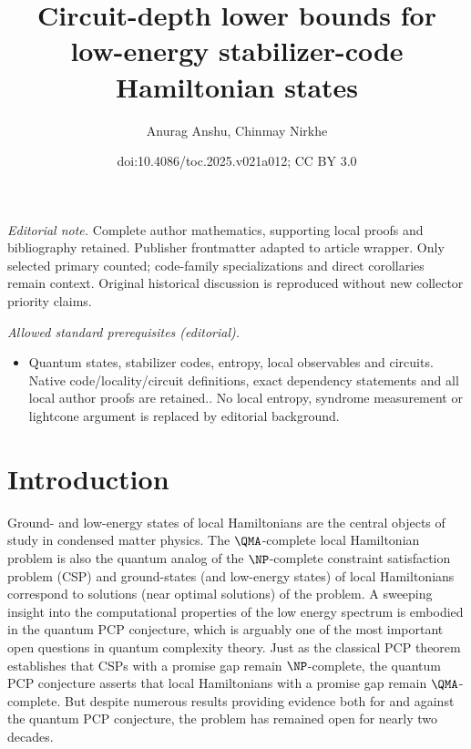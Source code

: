 \documentclass[11pt]{article}
\title{Circuit-depth lower bounds for low-energy stabilizer-code Hamiltonian states}
\author{Anurag Anshu, Chinmay Nirkhe}
\date{doi:10.4086/toc.2025.v021a012; CC BY 3.0}
\begin{document}
\maketitle
\noindent\textit{Editorial note.} Complete author mathematics, supporting local proofs and bibliography retained. Publisher frontmatter adapted to article wrapper. Only selected primary counted; code-family specializations and direct corollaries remain context. Original historical discussion is reproduced without new collector priority claims.\par\medskip
\noindent\textit{Allowed standard prerequisites (editorial).}\begin{itemize}
\item Quantum states, stabilizer codes, entropy, local observables and circuits. Native code/locality/circuit definitions, exact dependency statements and all local author proofs are retained.. No local entropy, syndrome measurement or lightcone argument is replaced by editorial background.
\end{itemize}\medskip
\section{Introduction}

Ground- and low-energy states of local Hamiltonians are the central objects of study in condensed matter physics. The $\QMA$-complete local Hamiltonian problem is also the quantum analog of the $\NP$-complete constraint satisfaction problem (CSP) and ground-states (and low-energy states) of local Hamiltonians correspond to solutions (near optimal solutions) of the problem. A sweeping insight into the computational properties of the low energy spectrum is embodied in the quantum PCP conjecture, which is arguably one of the most important open questions in quantum complexity theory. Just as the classical PCP theorem establishes that CSPs with a promise gap remain $\NP$-complete, the quantum PCP conjecture asserts that local Hamiltonians with a promise gap remain $\QMA$-complete. But despite numerous results providing evidence both for \cite{10.1145/1536414.1536472,10.5555/2600498.2600507,8104078,nirkhe_et_al:LIPIcs:2018:9095,DBLP:conf/focs/NatarajanV18,Eldar2019RobustQE} and against \cite{10.5555/2011637.2011639,10.1145/2488608.2488719,10.1007/s11128-014-0877-9} the quantum PCP conjecture, the problem has remained open for nearly two decades. 
\end{document}
